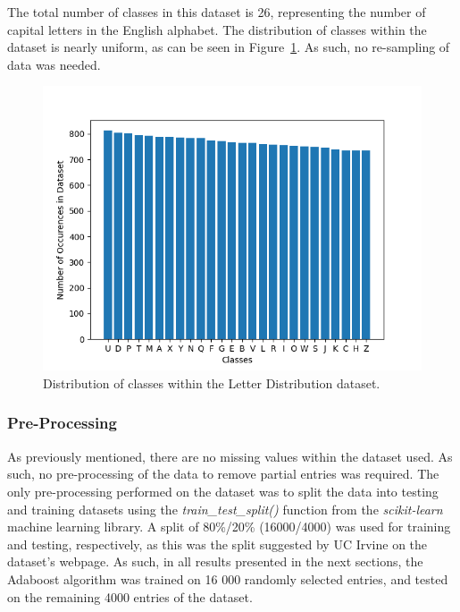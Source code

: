 \documentclass[a4paper]{article}
\begin{document}
The total number of classes in this dataset is 26, representing the number of capital letters in the English alphabet. The distribution of classes within the dataset is nearly uniform, as can be seen in Figure~\ref{fig:class-histogram}. As such, no re-sampling of data was needed.

\begin{figure}[h]
    \centering
    \includegraphics[scale=0.7]{images/class-distribution.png}
    \caption{Distribution of classes within the Letter Distribution dataset.}
    \label{fig:class-histogram}
\end{figure}

\subsubsection{Pre-Processing}
As previously mentioned, there are no missing values within the dataset used. As such, no pre-processing of the data to remove partial entries was required. The only pre-processing performed on the dataset was to split the data into testing and training datasets using the \textit{train\_test\_split()} function from the \textit{scikit-learn} machine learning library. A split of 80\%/20\% (16000/4000) was used for training and testing, respectively, as this was the split suggested by UC Irvine on the dataset's webpage. As such, in all results presented in the next sections, the Adaboost algorithm was trained on 16 000 randomly selected entries, and tested on the remaining 4000 entries of the dataset.
\end{document}
